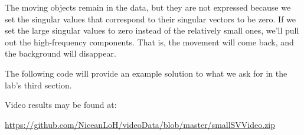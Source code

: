 The moving objects remain in the data, but they are not expressed because we set the singular values that correspond to their singular vectors to be zero. If we set the large singular values to zero instead of the relatively small ones, we'll pull out the high-frequency components. That is, the movement will come back, and the background will disappear.

The following code will provide an example solution to what we ask for in the lab's third section.


Video results may be found at:

\url{https://github.com/NiceanLoH/videoData/blob/master/smallSVVideo.zip}
